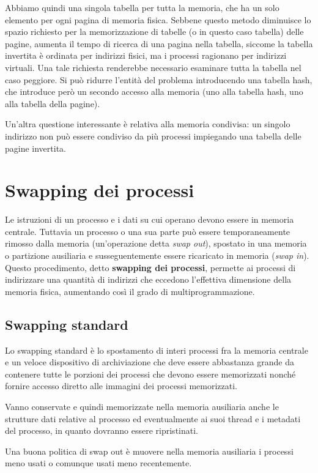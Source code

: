         Abbiamo quindi una singola tabella per tutta la memoria, che ha un solo elemento per ogni pagina di memoria fisica. Sebbene questo metodo diminuisce lo spazio richiesto per la memorizzazione di tabelle (o in questo caso tabella) delle pagine, aumenta il tempo di ricerca di una pagina nella tabella, siccome la tabella invertita è ordinata per indirizzi fisici, ma i processi ragionano per indirizzi virtuali. Una tale richiesta renderebbe necessario esaminare tutta la tabella nel caso peggiore. Si può ridurre l'entità del problema introducendo una tabella hash, che introduce però un secondo accesso alla memoria (uno alla tabella hash, uno alla tabella della pagine).
        
        Un'altra questione interessante è relativa alla memoria condivisa: un singolo indirizzo non può essere condiviso da più processi impiegando una tabella delle pagine invertita.
        
\section{Swapping dei processi}
    Le istruzioni di un processo e i dati su cui operano devono essere in memoria centrale. Tuttavia un processo o una sua parte può essere temporaneamente rimosso dalla memoria (un'operazione detta \textit{swap out}), spostato in una memoria o partizione ausiliaria e susseguentemente essere ricaricato in memoria (\textit{swap in}). Questo procedimento, detto \textbf{swapping dei processi}, permette ai processi di indirizzare una quantità di indirizzi che eccedono l'effettiva dimensione della memoria fisica, aumentando così il grado di multiprogrammazione.
    
    \subsection{Swapping standard}
        Lo swapping standard è lo spostamento di interi processi fra la memoria centrale e un veloce dispositivo di archiviazione che deve essere abbastanza grande da contenere tutte le porzioni dei processi che devono essere memorizzati nonché fornire accesso diretto alle immagini dei processi memorizzati.
        
        Vanno conservate e quindi memorizzate nella memoria ausiliaria anche le strutture dati relative al processo ed eventualmente ai suoi thread e i metadati del processo, in quanto dovranno essere ripristinati.
        
        Una buona politica di swap out è muovere nella memoria ausiliaria i processi meno usati o comunque usati meno recentemente.